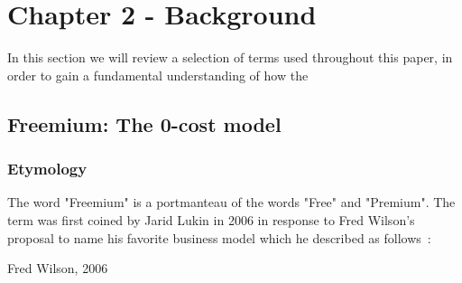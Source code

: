 \chapter{Chapter 2 - Background}
In this section we will review a selection of terms used throughout this paper, in order to gain a fundamental understanding of how the 
\section{Freemium: The 0-cost model}
\subsection {Etymology}
The word "Freemium" is a portmanteau of the words "Free" and "Premium". The term was first coined by Jarid Lukin in 2006 in response to Fred Wilson's proposal to name his favorite business model which he described as follows~\cite{freemiumdef}:
\begin{displayquote}
 Fred Wilson, 2006 \cite{barbarafindlayschenck2007}
\end{displayquote}
